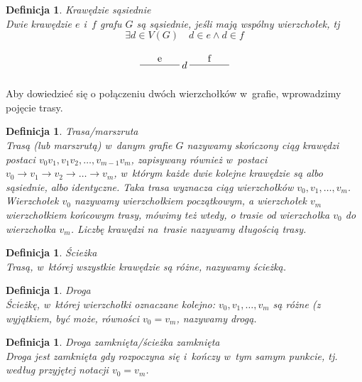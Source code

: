 \documentclass[12pt,a4paper]{report}
\newtheorem{definition}[theorem]{Definicja}
\begin{document}
\begin{definition}{Krawędzie sąsiednie \cite[Rozdział 2]{wilson2008}}\\
Dwie krawędzie $e$ i~$f$ grafu $G$ są sąsiednie, jeśli mają wspólny wierzchołek, tj
$$
\exists{d}\in V(G) \quad d \in e \land d\in f
$$

$$
\begin{tikzpicture}[scale=.7]
  \draw (-1.75,0)-- node[above] {f} ++(2,0);
  \draw node(d) at (-2,0) {$d$};
  \draw (-4.25,0) --node[above] {e} ++(2,0);
\end{tikzpicture}
$$
\end{definition}



Aby dowiedzieć się o połączeniu dwóch wierzchołków w~grafie, wprowadzimy pojęcie trasy.

\begin{definition}{Trasa/marszruta \cite[Rozdział 3]{wilson2008}}\\
Trasą (lub marszrutą) w~danym grafie $G$ nazywamy skończony ciąg krawędzi postaci \newline
$v_{0}v_{1}, v_{1}v_{2}, \ldots,v_{m-1}v_{m}$, zapisywany również w~postaci $v_{0} \rightarrow{} v_{1} \rightarrow{} v_{2} \rightarrow{} \ldots \rightarrow{} v_{m}$, w~którym każde dwie kolejne krawędzie są albo sąsiednie, albo identyczne. Taka trasa wyznacza ciąg wierzchołków $v_{0}, v_{1}, \ldots, v_{m}$. Wierzchołek $v_{0}$ nazywamy wierzchołkiem początkowym, a wierzchołek $v_{m}$ wierzchołkiem końcowym trasy, mówimy też wtedy, o trasie od wierzchołka $v_{0}$ do wierzchołka $v_{m}$. Liczbę krawędzi na~trasie nazywamy długością trasy. 
\end{definition}

\begin{definition}{Ścieżka \cite[Rozdział 3]{wilson2008}}\\
Trasą, w~której wszystkie krawędzie są różne, nazywamy ścieżką.
\end{definition}


\begin{definition}{Droga \cite[Rozdział 3]{wilson2008}}\\
Ścieżkę, w~której wierzchołki  oznaczane kolejno: 
$v_{0}, v_{1}, \ldots, v_{m}$ są różne (z wyjątkiem, być może, równości $v_{0}=v_{m}$, nazywamy drogą. 
\end{definition}


\begin{definition}{Droga zamknięta/ścieżka zamknięta \cite[Rozdział 3]{wilson2008}}\\
Droga jest zamknięta gdy rozpoczyna się i~kończy w~tym samym punkcie, tj. według przyjętej notacji $v_{0}=v_{m}$.
\end{definition}
\end{document}
